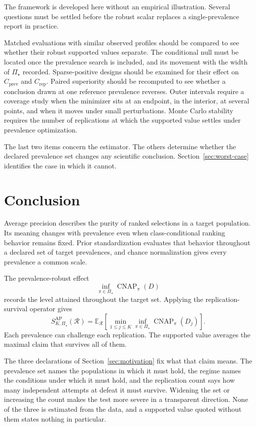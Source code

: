 \documentclass[11pt]{article}
\newcommand{\CNAP}{\operatorname{CNAP}}
\newcommand{\Regime}{\mathcal{R}}
\newcommand{\PSet}{\Pi_\star}
\newcommand{\E}{\mathbb{E}}
\theoremstyle{remark}
\begin{document}
The framework is developed here without an empirical illustration. Several questions must be settled before the robust scalar replaces a single-prevalence report in practice.

Matched evaluations with similar observed profiles should be compared to see whether their robust supported values separate. The conditional null must be located once the prevalence search is included, and its movement with the width of $\PSet$ recorded. Sparse-positive designs should be examined for their effect on $C_{\mathrm{prev}}$ and $C_{\mathrm{rep}}$. Paired superiority should be recomputed to see whether a conclusion drawn at one reference prevalence reverses. Outer intervals require a coverage study when the minimizer sits at an endpoint, in the interior, at several points, and when it moves under small perturbations. Monte Carlo stability requires the number of replications at which the supported value settles under prevalence optimization.

The last two items concern the estimator. The others determine whether the declared prevalence set changes any scientific conclusion. Section~\ref{sec:worst-case} identifies the case in which it cannot.

\section{Conclusion}

Average precision describes the purity of ranked selections in a target population. Its meaning changes with prevalence even when class-conditional ranking behavior remains fixed. Prior standardization evaluates that behavior throughout a declared set of target prevalences, and chance normalization gives every prevalence a common scale.

The prevalence-robust effect
\[
\inf_{\pi\in\PSet}\CNAP_\pi(D)
\]
records the level attained throughout the target set. Applying the replication-survival operator gives
\[
S_{K,\PSet}^{\mathrm{AP}}(\Regime)
=
\E_{\Regime}
\left[
\min_{1\leq j\leq K}
\inf_{\pi\in\PSet}
\CNAP_\pi(D_j)
\right].
\]
Each prevalence can challenge each replication. The supported value averages the maximal claim that survives all of them.

The three declarations of Section~\ref{sec:motivation} fix what that claim means. The prevalence set names the populations in which it must hold, the regime names the conditions under which it must hold, and the replication count says how many independent attempts at defeat it must survive. Widening the set or increasing the count makes the test more severe in a transparent direction. None of the three is estimated from the data, and a supported value quoted without them states nothing in particular.
\end{document}
